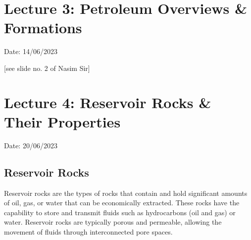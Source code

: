 \documentclass{article}
\begin{document}
    \section{Lecture 3: Petroleum Overviews \& Formations}
    \hfill Date: 14/06/2023
    
    [see slide no. 2 of Nasim Sir]

    \section{Lecture 4: Reservoir Rocks \& Their Properties}
    \hfill Date: 20/06/2023

    \subsection*{Reservoir Rocks} 
    Reservoir rocks are the types of rocks that contain and hold significant amounts of oil, gas, or water that can be economically extracted. These rocks have the capability to store and transmit fluids such as hydrocarbons (oil and gas) or water. Reservoir rocks are typically porous and permeable, allowing the movement of fluids through interconnected pore spaces.
\end{document}

